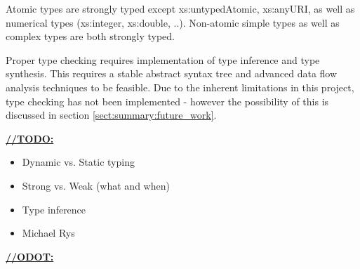 Atomic types are strongly typed except xs:untypedAtomic, xs:anyURI, as well as
numerical types (xs:integer, xs:double, ..). Non-atomic simple types as well as
complex types are both strongly typed.

Proper type checking requires implementation of type inference and type
synthesis. This requires a stable abstract syntax tree and advanced data flow
analysis techniques to be feasible. Due to the inherent limitations in this
project, type checking has not been implemented - however the possibility of
this is discussed in section \ref{sect:summary:future_work}.

\underline{\textbf{\LARGE //TODO:}}
\begin{itemize}
  \item Dynamic vs. Static typing
  \item Strong vs. Weak (what and when)
  \item Type inference
  \item Michael Rys
\end{itemize}

\underline{\textbf{\LARGE //ODOT:}}